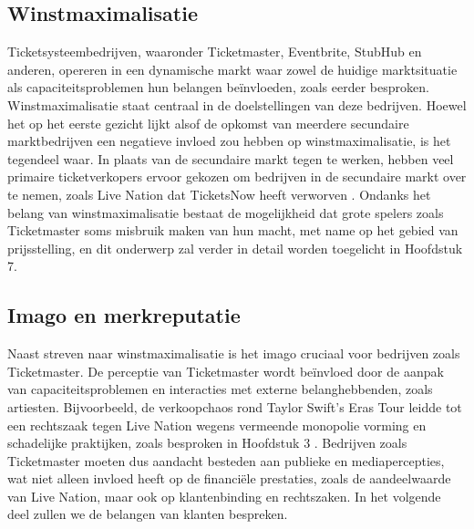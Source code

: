\subsection{Winstmaximalisatie}
Ticketsysteembedrijven, waaronder Ticketmaster, Eventbrite, StubHub en anderen, opereren in een dynamische markt waar zowel de huidige 
marktsituatie als capaciteitsproblemen hun belangen beïnvloeden, zoals eerder besproken. Winstmaximalisatie staat centraal in de doelstellingen 
van deze bedrijven.
Hoewel het op het eerste gezicht lijkt alsof de opkomst van meerdere secundaire marktbedrijven een negatieve invloed zou hebben op 
winstmaximalisatie, is het tegendeel waar. In plaats van de secundaire markt tegen te werken, hebben veel primaire ticketverkopers ervoor gekozen 
om bedrijven in de secundaire markt over te nemen, zoals Live Nation dat TicketsNow heeft verworven \cite{Holmstrom2019}.
Ondanks het belang van winstmaximalisatie bestaat de mogelijkheid dat grote spelers zoals Ticketmaster soms misbruik maken van hun macht, met name 
op het gebied van prijsstelling, en dit onderwerp zal verder in detail worden toegelicht in Hoofdstuk 7.


\subsection{Imago en merkreputatie}

Naast streven naar winstmaximalisatie is het imago cruciaal voor bedrijven zoals Ticketmaster. De perceptie van Ticketmaster wordt beïnvloed door 
de aanpak van capaciteitsproblemen en interacties met externe belanghebbenden, zoals artiesten. Bijvoorbeeld, de verkoopchaos rond Taylor Swift's 
Eras Tour leidde tot een rechtszaak tegen Live Nation wegens vermeende monopolie vorming en schadelijke praktijken, zoals besproken in Hoofdstuk 3 \cite{Knack:online}.
Bedrijven zoals Ticketmaster moeten dus aandacht besteden aan publieke en mediapercepties, wat niet alleen invloed heeft op de financiële 
prestaties, zoals de aandeelwaarde van Live Nation, maar ook op klantenbinding en rechtszaken. In het volgende deel zullen we de belangen van 
klanten bespreken.


